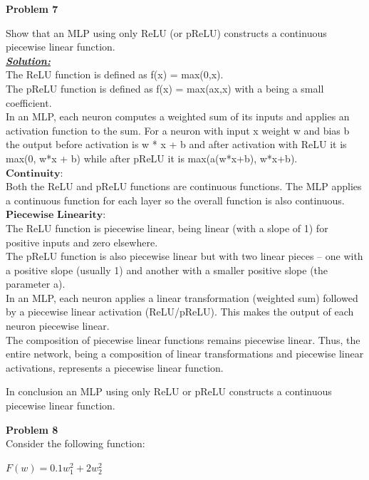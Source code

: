 \documentclass{article}
\begin{document}
\newpage
\noindent \textbf{Problem 7}

\noindent Show that an MLP using only ReLU (or pReLU) constructs a continuous piecewise linear function. \\

\noindent \underline{\textbf{\textit{Solution:}}} \\ 

\noindent The ReLU function is defined as f(x) = max(0,x).\\
The pReLU function is defined as f(x) = max(ax,x) with a being a small coefficient.\\
In an MLP, each neuron computes a weighted sum of its inputs and applies an activation function to the sum. For a neuron 
with input x weight w and bias b the output before activation is w * x + b and after activation with ReLU it is max(0, w*x + b) while after pReLU it is max(a(w*x+b), w*x+b). \\

\noindent$\bm{Continuity:} $\\
Both the ReLU and pReLU functions are continuous functions. The MLP applies a continuous function for each layer so the overall function is also continuous.\\

\noindent$\bm{Piecewise}$ $ \bm{Linearity:} $\\
The ReLU function is piecewise linear, being linear (with a slope of 1) for positive inputs and zero elsewhere. \\
The pReLU function is also piecewise linear but with two linear pieces – one with a positive slope (usually 1) and another with a smaller positive slope (the parameter a). \\
In an MLP, each neuron applies a linear transformation (weighted sum) followed by a piecewise linear activation (ReLU/pReLU). This makes the output of each neuron piecewise linear. \\
The composition of piecewise linear functions remains piecewise linear. Thus, the entire network, being a composition of linear transformations and piecewise linear activations, represents a piecewise linear function.

\noindent In conclusion an MLP using only ReLU or pReLU constructs a continuous piecewise linear function.


\newpage
\noindent \textbf{Problem 8} \\
Consider the following function:
\begin{center}
    $ F(w) = 0.1w_1^2 + 2w_2^2$
\end{center}
\end{document}
